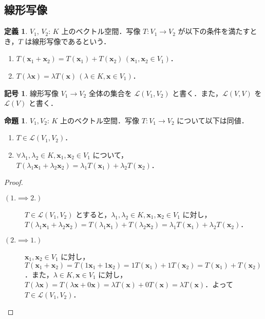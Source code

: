 \documentclass{jlreq}
\theoremstyle{definition}
\newtheorem{dfn}[thm]{定義}
\newtheorem{sym}[thm]{記号}
\newtheorem{prop}[thm]{命題}
\begin{document}
    \subsection{線形写像}
      \begin{dfn}
        $V_1$, $V_2$: $K$ 上のベクトル空間．写像 $T \colon V_1 \to V_2$ が以下の条件を満たすとき，$T$ は線形写像であるという．
        \begin{enumerate}
          \item $T(\bm{x}_1+\bm{x}_2)=T(\bm{x}_1)+T(\bm{x}_2) \, (\bm{x}_1,\bm{x}_2 \in V_1)$．
          \item $T(\lambda\bm{x})=\lambda T(\bm{x}) \, (\lambda \in K, \bm{x} \in V_1)$．
        \end{enumerate}
      \end{dfn}
      \begin{sym}
        線形写像 $V_1 \to V_2$ 全体の集合を $\mathcal{L}(V_1,V_2)$ と書く．また，$\mathcal{L}(V,V)$ を $\mathcal{L}(V)$ と書く．
      \end{sym}
      \begin{prop}
        $V_1, V_2$: $K$ 上のベクトル空間．写像 $T \colon V_1 \to V_2$ について以下は同値．
        \begin{enumerate}
          \item $T \in \mathcal{L}(V_1,V_2)$．
          \item $\forall \lambda_1,\lambda_2 \in K, \bm{x}_1,\bm{x}_2 \in V_1$ について，$T(\lambda_1\bm{x}_1+\lambda_2\bm{x}_2)=\lambda_1T(\bm{x}_1)+\lambda_2T(\bm{x}_2)$．
        \end{enumerate}
      \end{prop}
      \begin{proof}
        \mbox{}
        \begin{description}
          \item [$(1. \implies 2.) \, $]
            \mbox{}
            
            $T \in \mathcal{L}(V_1,V_2)$ とすると，$\lambda_1,\lambda_2 \in K, \bm{x}_1,\bm{x}_2 \in V_1$ に対し，$T(\lambda_1\bm{x}_1+\lambda_2\bm{x}_2)=T(\lambda_1\bm{x}_1)+T(\lambda_2\bm{x}_2)=\lambda_1T(\bm{x}_1)+\lambda_2T(\bm{x}_2)$．
          \item [$(2. \implies 1.) \, $]
            \mbox{}
            
            $\bm{x}_1,\bm{x}_2 \in V_1$ に対し，$T(\bm{x}_1+\bm{x}_2)=T(1\bm{x}_1+1\bm{x}_2)=1T(\bm{x}_1)+1T(\bm{x}_2)=T(\bm{x}_1)+T(\bm{x}_2)$．また，$\lambda \in K, \bm{x} \in V_1$ に対し，$T(\lambda \bm{x}) = T(\lambda \bm{x} + 0\bm{x}) = \lambda T(\bm{x}) + 0T(\bm{x}) = \lambda T(\bm{x})$．よって $T\in\mathcal{L}(V_1,V_2)$．
        \end{description}
      \end{proof}
\end{document}
